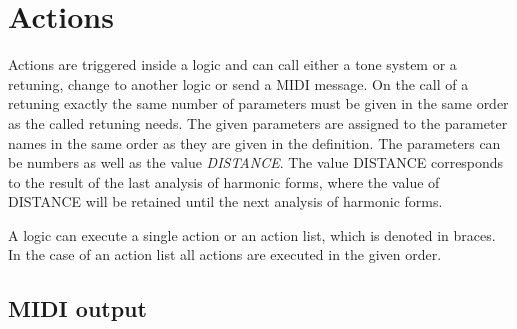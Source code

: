     

\section{Actions}\label{sec:aktionen}

Actions are triggered inside a logic and can call either a
tone system or a retuning, change to another logic or send a MIDI
message. On the call of a retuning exactly the same number of
parameters must be given in the same order as the
called retuning needs. The given parameters are assigned to the
parameter names in the same order as they are given in the
definition. The parameters can be numbers as well as the value
\textit{DISTANCE}. The value DISTANCE corresponds to
the result of the last analysis of harmonic forms, where the value of
DISTANCE will be retained until the next analysis of harmonic forms.

\iffalse
Aktionen werden innerhalb einer Logik ausgelöst und können wahlweise
ein Tonsystem aufrufen, eine Umstimmung aufrufen,
zu einer Logik wechseln oder eine MIDI-Nachricht
senden. Beim Aufruf einer Umstimmung müssen genau so viele Parameter\index{Parameter}
mitgegeben werden, wie die aufgerufene Umstimmung benötigt. Die mitgegebenen
Parameter werden in der gleichen Reihenfolge den Parameter-Namen
der Umstimmung zugeordnet. Als Parameter können Zahlen angegeben werden,
sowie der Wert {\it ABSTAND}\index{ABSTAND}.
Der Wert ABSTAND entspricht den Gegebenheiten der
zuletzt durchgeführten Harmonie-FORM-Analyse, wobei der Wert
ABSTAND bis zur nächsten Harmonie-FORM-Analyse beibehalten wird.
\fi

A logic can execute a single action or an action list, which is
denoted in braces. In the case of an action list all actions are
executed in the given order.

\iffalse
Eine Logik kann eine einzelne Aktion ausführen oder eine in geschweiften
Klammern stehende Aktions-Liste aus\-füh\-ren. Im Falle der Aktions-Liste
werden die einzelnen Aktionen der Liste in genau der angegebenen
Reihenfolge ausgeführt.
\fi

\subsection{MIDI output}\label{sec:midi-ausgaben}

